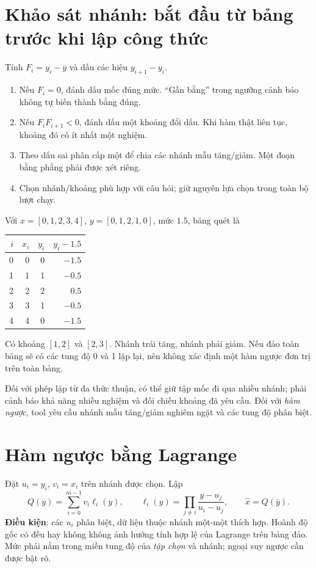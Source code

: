 \section{Khảo sát nhánh: bắt đầu từ bảng trước khi lập công thức}
\label{sec:inverse-scan}
Tính $F_i=y_i-\bar y$ và dấu các hiệu $y_{i+1}-y_i$.
\begin{enumerate}
\item Nếu $F_i=0$, đánh dấu mốc đúng mức. ``Gần bằng'' trong ngưỡng cảnh báo không tự biến thành bằng đúng.
\item Nếu $F_iF_{i+1}<0$, đánh dấu một khoảng đổi dấu. Khi hàm thật liên tục, khoảng đó có ít nhất một nghiệm.
\item Theo dấu sai phân cấp một để chia các nhánh mẫu tăng/giảm. Một đoạn bằng phẳng phải được xét riêng.
\item Chọn nhánh/khoảng phù hợp với câu hỏi; giữ nguyên lựa chọn trong toàn bộ lượt chạy.
\end{enumerate}
Với $x=[0,1,2,3,4]$, $y=[0,1,2,1,0]$, mức $1.5$, bảng quét là
\begin{center}\begin{tabular}{@{}rrrr@{}}\toprule
$i$ & $x_i$ & $y_i$ & $y_i-1.5$\\\midrule
0 & 0 & 0 & $-1.5$\\
1 & 1 & 1 & $-0.5$\\
2 & 2 & 2 & $0.5$\\
3 & 3 & 1 & $-0.5$\\
4 & 4 & 0 & $-1.5$\\\bottomrule
\end{tabular}\end{center}
Có khoảng $[1,2]$ và $[2,3]$. Nhánh trái tăng, nhánh phải giảm. Nếu đảo toàn bảng sẽ có các tung độ 0 và 1 lặp lại, nên không xác định một hàm ngược đơn trị trên toàn bảng.

Đối với phép lặp từ đa thức thuận, có thể giữ tập mốc đi qua nhiều nhánh; phải cảnh báo khả năng nhiều nghiệm và đối chiếu khoảng đã yêu cầu. Đối với \emph{hàm ngược}, tool yêu cầu nhánh mẫu tăng/giảm nghiêm ngặt và các tung độ phân biệt.

\section{Hàm ngược bằng Lagrange}
\label{sec:inverse-lagrange}
Đặt $u_i=y_i$, $v_i=x_i$ trên nhánh được chọn. Lập
\[
 Q(y)=\sum_{i=0}^{m-1}v_i\ell_i(y),\qquad
 \ell_i(y)=\prod_{j\ne i}\frac{y-u_j}{u_i-u_j},\qquad
 \widehat x=Q(\bar y).
\]
\textbf{Điều kiện}: các $u_i$ phân biệt, dữ liệu thuộc nhánh một-một thích hợp. Hoành độ gốc có đều hay không không ảnh hưởng tính hợp lệ của Lagrange trên bảng đảo. Mức phải nằm trong miền tung độ của \emph{tập chọn} và nhánh; ngoại suy ngược cần được bật rõ.

